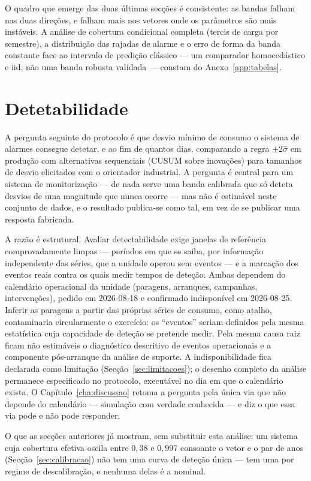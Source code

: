 O quadro que emerge das duas últimas secções é consistente: as bandas falham
nas duas direções, e falham mais nos vetores onde os parâmetros são mais
instáveis. A análise de cobertura condicional completa (tercis de carga por
semestre), a distribuição das rajadas de alarme e o erro de forma da banda
constante face ao intervalo de predição clássico --- um comparador
homocedástico e iid, não uma banda robusta validada --- constam do
Anexo~\ref{app:tabelas}.

\section{Detetabilidade}
\label{sec:detetabilidade}

A pergunta seguinte do protocolo é que desvio mínimo de consumo o sistema de alarmes
consegue detetar, e ao fim de quantos dias, comparando a regra
$\pm 2\hat\sigma$ em produção com alternativas sequenciais (CUSUM sobre
inovações) para tamanhos de desvio elicitados com o orientador industrial. A
pergunta é central para um sistema de monitorização --- de nada serve uma
banda calibrada que só deteta desvios de uma magnitude que nunca ocorre ---
mas não é estimável neste conjunto de dados, e o resultado publica-se como
tal, em vez de se publicar uma resposta fabricada.

A razão é estrutural. Avaliar detectabilidade exige janelas de referência
comprovadamente limpas --- períodos em que se saiba, por informação
independente das séries, que a unidade operou sem eventos --- e a marcação
dos eventos reais contra os quais medir tempos de deteção. Ambas dependem do
calendário operacional da unidade (paragens, arranques, campanhas,
intervenções), pedido em 2026-08-18 e confirmado indisponível em 2026-08-25.
Inferir as paragens a partir das próprias séries de consumo, como atalho,
contaminaria circularmente o exercício: os ``eventos'' seriam definidos pela
mesma estatística cuja capacidade de deteção se pretende medir. Pela mesma
causa raiz ficam não estimáveis o diagnóstico descritivo de eventos
operacionais e a componente pós-arranque da análise de suporte. A
indisponibilidade fica declarada como limitação
(Secção~\ref{sec:limitacoes}); o desenho completo da análise permanece
especificado no protocolo, executável no dia em que o calendário exista.
O Capítulo~\ref{cha:discussao} retoma a pergunta pela única via que não
depende do calendário --- simulação com verdade conhecida --- e diz o que
essa via pode e não pode responder.

O que as secções anteriores já mostram, sem substituir esta análise: um sistema cuja
cobertura efetiva oscila entre $0{,}38$ e $0{,}997$ consoante o vetor e o par
de anos (Secção~\ref{sec:calibracao}) não tem uma curva de deteção única
--- tem uma por regime de descalibração, e nenhuma delas é a nominal.


